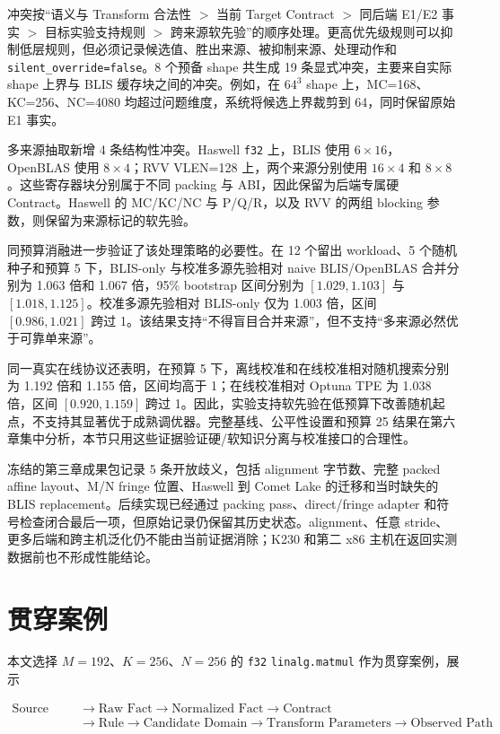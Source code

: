 冲突按“语义与 Transform 合法性 $>$ 当前 Target Contract $>$ 同后端 E1/E2 事实 $>$ 目标实验支持规则 $>$ 跨来源软先验”的顺序处理。更高优先级规则可以抑制低层规则，但必须记录候选值、胜出来源、被抑制来源、处理动作和 \texttt{silent\_override=false}。8 个预备 shape 共生成 19 条显式冲突，主要来自实际 shape 上界与 BLIS 缓存块之间的冲突。例如，在 $64^3$ shape 上，MC=168、KC=256、NC=4080 均超过问题维度，系统将候选上界裁剪到 64，同时保留原始 E1 事实。

多来源抽取新增 4 条结构性冲突。Haswell \texttt{f32} 上，BLIS 使用 $6\times16$，OpenBLAS 使用 $8\times4$；RVV VLEN=128 上，两个来源分别使用 $16\times4$ 和 $8\times8$。这些寄存器块分别属于不同 packing 与 ABI，因此保留为后端专属硬 Contract。Haswell 的 MC/KC/NC 与 P/Q/R，以及 RVV 的两组 blocking 参数，则保留为来源标记的软先验。

同预算消融进一步验证了该处理策略的必要性。在 12 个留出 workload、5 个随机种子和预算 5 下，BLIS-only 与校准多源先验相对 naive BLIS/OpenBLAS 合并分别为 1.063 倍和 1.067 倍，95\% bootstrap 区间分别为 $[1.029,1.103]$ 与 $[1.018,1.125]$。校准多源先验相对 BLIS-only 仅为 1.003 倍，区间 $[0.986,1.021]$ 跨过 1。该结果支持“不得盲目合并来源”，但不支持“多来源必然优于可靠单来源”。

同一真实在线协议还表明，在预算 5 下，离线校准和在线校准相对随机搜索分别为 1.192 倍和 1.155 倍，区间均高于 1；在线校准相对 Optuna TPE 为 1.038 倍，区间 $[0.920,1.159]$ 跨过 1。因此，实验支持软先验在低预算下改善随机起点，不支持其显著优于成熟调优器。完整基线、公平性设置和预算 25 结果在第六章集中分析，本节只用这些证据验证硬/软知识分离与校准接口的合理性。

冻结的第三章成果包记录 5 条开放歧义，包括 alignment 字节数、完整 packed affine layout、M/N fringe 位置、Haswell 到 Comet Lake 的迁移和当时缺失的 BLIS replacement。后续实现已经通过 packing pass、direct/fringe adapter 和符号检查闭合最后一项，但原始记录仍保留其历史状态。alignment、任意 stride、更多后端和跨主机泛化仍不能由当前证据消除；K230 和第二 x86 主机在返回实测数据前也不形成性能结论。

\section{贯穿案例}

本文选择 $M=192$、$K=256$、$N=256$ 的 \texttt{f32} \texttt{linalg.matmul} 作为贯穿案例，展示

\begin{equation}
\begin{aligned}
\text{Source Line}
&\rightarrow\text{Raw Fact}
\rightarrow\text{Normalized Fact}
\rightarrow\text{Contract}\\
&\rightarrow\text{Rule}
\rightarrow\text{Candidate Domain}
\rightarrow\text{Transform Parameters}
\rightarrow\text{Observed Path}
\end{aligned}
\label{eq:chapter3-provenance-chain}
\end{equation}

